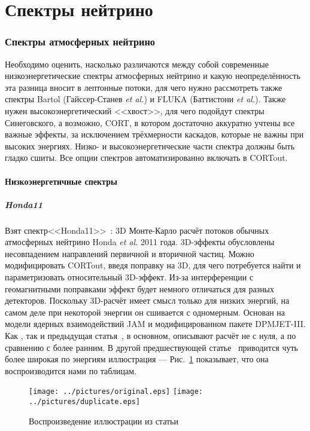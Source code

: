 \part{Спектры нейтрино}
\section{Спектры атмосферных нейтрино}
{\color{MYgreen}Необходимо оценить, насколько различаются между собой современные низкоэнергетические спектры атмосферных нейтрино и какую неопределённость эта разница вносит в лептонные потоки, для чего нужно рассмотреть также спектры Bartol (Гайссер-Станев \emph{et al.}) и FLUKA (Баттистони \emph{et al.}). Также нужен высокоэнергетический <<хвост>>, для чего подойдут спектры Синеговского, а возможно, CORT, в котором достаточно аккуратно учтены все важные эффекты, за исключением трёхмерности каскадов, которые не важны при высоких энергиях. Низко- и высокоэнергетические части спектра должны быть гладко сшиты. {\color{brown}Все опции спектров автоматизированно включать в CORTout.}}

\subsection{Низкоэнергетичные спектры}
\subsubsection{Honda11}
{\color{blue}Взят спектр<<Honda11>>}~\cite{Honda:2011nf}: 3D Монте-Карло расчёт потоков обычных атмосферных нейтрино Honda \emph{et al.} 2011 года. \textsf{3D-эффекты обусловлены несовпадением направлений первичной и вторичной частиц.} {\color{brown}Можно модифицировать CORTout, введя поправку на 3D, для чего потребуется найти и параметризовать относительный 3D-эффект.} \textsf{Из-за интерференции с геомагнитными поправками эффект будет немного отличаться для разных детекторов.} Поскольку 3D-расчёт имеет смысл только для низких энергий, на самом деле при некоторой энергии он сшивается с одномерным. {\color{brown}Основан на модели ядерных взаимодействий JAM и модифицированном пакете DPMJET-III.} Как \cite{Honda:2011nf}, так и предыдущая статья~\cite{Sanuki:2006yd}, в основном, описывают расчёт не с нуля, а по сравнению с более ранним. В другой предшествующей статье~\cite{Honda:2006qj} приводится  чуть более широкая по энергиям иллюстрация --- Рис.~\ref{comparison} показывает, что она воспроизводится нами по таблицам.
\begin{figure}[!ht]
\begin{center}
\texttt{[image: ../pictures/original.eps]}
\texttt{[image: ../pictures/duplicate.eps]}
\end{center}
\caption{Воспроизведение иллюстрации из статьи~\cite{Honda:2006qj}}
\label{comparison}
\end{figure}

